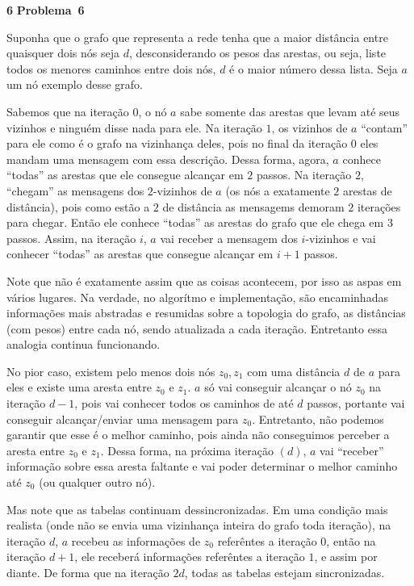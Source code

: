 \documentclass{article}
\newcounter{exe-list}
\newenvironment{exe}[2][Problema]
    {\newcommand{\opt}{(Opcional)}%
    \newcommand{\sketch}[1]{{\bfseries Rascunho:} ##1}%
    \medskip\par\noindent\ifthenelse{\equal{#1}{}}
        {\textbf{\large #2}}
        {\textbf{\large #1~#2}}%
    \medskip\par\noindent}
    {\medskip}
\begin{document}
\begin{exe}{6}
    Suponha que o grafo que representa a rede tenha
    que a maior distância entre quaisquer dois nós seja \(d\),
    desconsiderando os pesos das arestas,
    ou seja, liste todos os menores caminhos entre dois nós,
    \(d\) é o maior número dessa lista.
    Seja \(a\) um nó exemplo desse grafo.
    \par
    Sabemos que na iteração \(0\),
    o nó \(a\) sabe somente das arestas que levam até seus vizinhos e
    ninguém disse nada para ele.
    Na iteração \(1\), os vizinhos de \(a\) ``contam'' para ele
    como é o grafo na vizinhança deles,
    pois no final da iteração \(0\) eles mandam uma mensagem
    com essa descrição.
    Dessa forma, agora, \(a\) conhece ``todas''
    as arestas que ele consegue alcançar em \(2\) passos.
    Na iteração \(2\), ``chegam''
    as mensagens dos \(2\)-vizinhos de \(a\)
    (os nós a exatamente \(2\) arestas de distância),
    pois como estão a \(2\) de distância as mensagems demoram
    \(2\) iterações para chegar.
    Então ele conhece ``todas'' as arestas do grafo
    que ele chega em \(3\) passos.
    Assim, na iteração \(i\),
    \(a\) vai receber a mensagem dos \(i\)-vizinhos e
    vai conhecer ``todas'' as arestas
    que consegue alcançar em \(i+1\) passos.
    \par
    Note que não é exatamente assim que as coisas acontecem,
    por isso as aspas em vários lugares.
    Na verdade, no algorítmo e implementação,
    são encaminhadas informações
    mais abstradas e resumidas sobre a topologia do grafo,
    as distâncias (com pesos) entre cada nó,
    sendo atualizada a cada iteração.
    Entretanto essa analogia continua funcionando.
    \par
    No pior caso, existem pelo menos dois nós \(z_0, z_1\)
    com uma distância \(d\) de \(a\) para eles e
    existe uma aresta entre \(z_0\) e \(z_1\).
    \(a\) só vai conseguir alcançar o nó \(z_0\)
    na iteração \(d-1\),
    pois vai conhecer todos os caminhos de até \(d\) passos,
    portante vai conseguir alcançar/enviar uma mensagem para \(z_0\).
    Entretanto, não podemos garantir que esse é o melhor caminho,
    pois ainda não conseguimos perceber
    a aresta entre \(z_0\) e \(z_1\).
    Dessa forma, na próxima iteração \((d)\),
    \(a\) vai ``receber'' informação sobre essa aresta faltante
    e vai poder determinar o melhor caminho até \(z_0\)
    (ou qualquer outro nó).
    \par
    Mas note que as tabelas continuam dessincronizadas.
    Em uma condição mais realista
    (onde não se envia uma vizinhança inteira do grafo toda iteração),
    na iteração \(d\),
    \(a\) recebeu as informações de \(z_0\)
    referêntes a iteração \(0\),
    então na iteração \(d+1\), ele receberá informações
    referêntes a iteração \(1\),
    e assim por diante.
    De forma que na iteração \(2d\),
    todas as tabelas estejam sincronizadas.
\end{exe}
\end{document}
